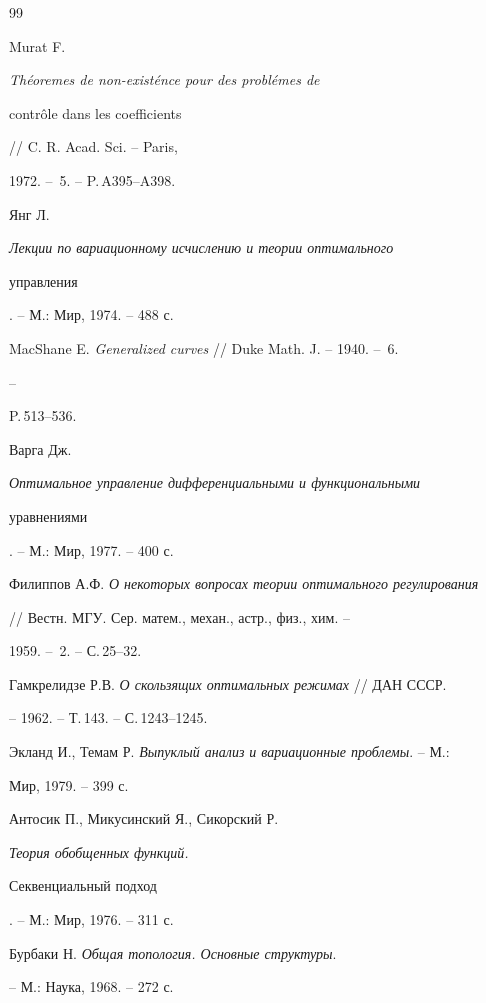 \begin{thebibliography}{99} 


 




Murat F. {\em Th\'eoremes de non-exist\'ence pour des probl\'emes de 


contr\^ole dans les coefficients} // C. R. Acad. Sci. -- Paris, 


1972. -- \No\,5. -- P.\,A395--A398. 




Янг Л. {\em Лекции по вариационному исчислению и теории оптимального 


управления}. -- М.: Мир, 1974. -- 488 с. 




MacShane E. {\em Generalized curves} // Duke Math. J. -- 1940. -- \No\,6. 


-- 


P.\,513--536. 




Варга Дж. {\em Оптимальное управление дифференциальными и функциональными 


уравнениями}. -- М.: Мир, 1977. -- 400 с. 




Филиппов А.Ф. {\em О некоторых вопросах теории оптимального регулирования} 


// Вестн. МГУ. Сер. матем., механ., астр., физ., хим. -- 


1959. -- \No\,2. -- С.\,25--32. 




Гамкрелидзе Р.В. {\em О скользящих оптимальных режимах} // ДАН СССР. 


-- 1962. -- Т.\,143. -- С.\,1243--1245. 




Экланд И., Темам Р. {\em Выпуклый анализ и вариационные проблемы}. -- М.: 


Мир, 1979. -- 399 с. 




Антосик П., Микусинский Я., Сикорский Р. {\em Теория обобщенных функций. 


Секвенциальный подход}. -- М.: Мир, 1976. -- 311 с. 




Бурбаки Н. {\em Общая топология. Основные структуры}. 


-- М.: Наука, 1968. -- 272 с. 



\end{thebibliography}
